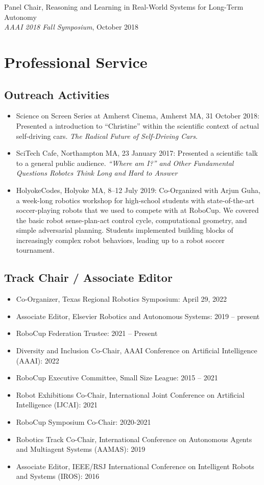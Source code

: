 \documentclass[Times]{article}
\begin{document}
Panel Chair, Reasoning and Learning in Real-World Systems for Long-Term
Autonomy\\
{\em AAAI 2018 Fall Symposium}, October 2018

\section*{Professional Service}

\subsection*{Outreach Activities}
\begin{itemize}
\item Science on Screen Series at Amherst Cinema, Amherst MA, 31 October 2018:
Presented a introduction to ``Christine'' within the scientific context of
actual self-driving cars. \emph{The Radical Future of Self-Driving Cars}.
\item SciTech Cafe, Northampton MA, 23 January 2017: Presented a scientific talk
to a general public audience. \emph{``Where am I?'' and
  Other Fundamental Questions Robotcs Think Long and Hard to Answer}
\item HolyokeCodes, Holyoke MA, 8--12 July 2019: Co-Organized with Arjun Guha, a week-long
robotics workshop for high-school students with state-of-the-art soccer-playing
robots that we used to compete with at RoboCup. We
covered the basic robot sense-plan-act control cycle, computational geometry,
and simple adversarial planning. Students implemented building blocks of
increasingly complex robot behaviors, leading up to a robot soccer tournament.
\end{itemize}

\subsection*{Track Chair / Associate Editor}

\begin{itemize}
  \item Co-Organizer, Texas Regional Robotics Symposium: April 29, 2022
  \item Associate Editor, Elsevier Robotics and Autonomous Systems: 2019 -- present
  \item RoboCup Federation Trustee: 2021 -- Present
  \item Diversity and Inclusion Co-Chair, AAAI Conference on Artificial Intelligence (AAAI): 2022
  \item RoboCup Executive Committee, Small Size League: 2015 -- 2021
  \item Robot Exhibitions Co-Chair, International Joint Conference on Artificial Intelligence (IJCAI): 2021
  \item RoboCup Symposium Co-Chair: 2020-2021
\item Robotics Track Co-Chair, International Conference on Autonomous Agents and
Multiagent Systems (AAMAS): 2019
  \item Associate Editor, IEEE/RSJ International Conference on Intelligent
Robots and Systems (IROS): 2016
\end{itemize}
\end{document}

